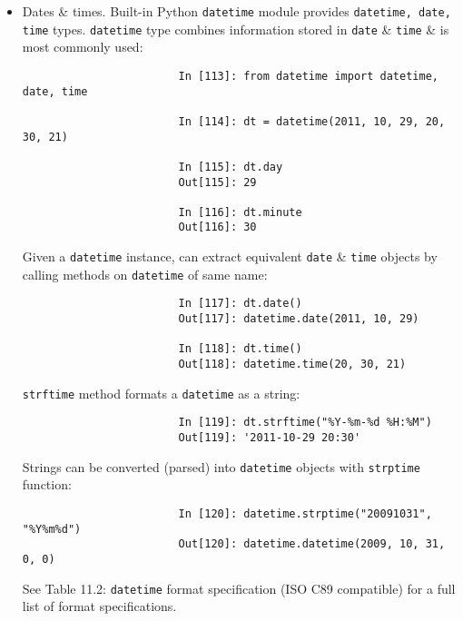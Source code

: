 \documentclass{article}
\begin{document}
\begin{enumerate}
\begin{itemize}
\begin{itemize}
\begin{itemize}
\begin{itemize}
\begin{verbatim}
						In [110]: a is None
						Out[110]: True
						
						In [111]: b = 5
						
						In [112]: b is not None
						Out[112]: True
					\end{verbatim}
					{\tt None} is also a common default value for function arguments:
					\begin{verbatim}
						def add_and_maybe_multiply(a, b, c = None):
						    result = a + b
						    
						    if c is not None:
						        result = result * c
						    
						    return result
					\end{verbatim}
					\item {\sf Dates \& times.} Built-in Python {\tt datetime} module provides {\tt datetime, date, time} types. {\tt datetime} type combines information stored in {\tt date} \& {\tt time} \& is most commonly used:
					\begin{verbatim}
						In [113]: from datetime import datetime, date, time
						
						In [114]: dt = datetime(2011, 10, 29, 20, 30, 21)
						
						In [115]: dt.day
						Out[115]: 29
						
						In [116]: dt.minute
						Out[116]: 30
					\end{verbatim}
					Given a {\tt datetime} instance, can extract equivalent {\tt date} \& {\tt time} objects by calling methods on {\tt datetime} of same name:
					\begin{verbatim}
						In [117]: dt.date()
						Out[117]: datetime.date(2011, 10, 29)
						
						In [118]: dt.time()
						Out[118]: datetime.time(20, 30, 21)
					\end{verbatim}
					{\tt strftime} method formats a {\tt datetime} as a string:
					\begin{verbatim}
						In [119]: dt.strftime("%Y-%m-%d %H:%M")
						Out[119]: '2011-10-29 20:30'
					\end{verbatim}
					Strings can be converted (parsed) into {\tt datetime} objects with {\tt strptime} function:
					\begin{verbatim}
						In [120]: datetime.strptime("20091031", "%Y%m%d")
						Out[120]: datetime.datetime(2009, 10, 31, 0, 0)
					\end{verbatim}
					See {\sf Table 11.2: {\tt datetime} format specification (ISO C89 compatible)} for a full list of format specifications.
					

\end{itemize}
\end{itemize}
\end{itemize}
\end{itemize}
\end{enumerate}
\end{document}
